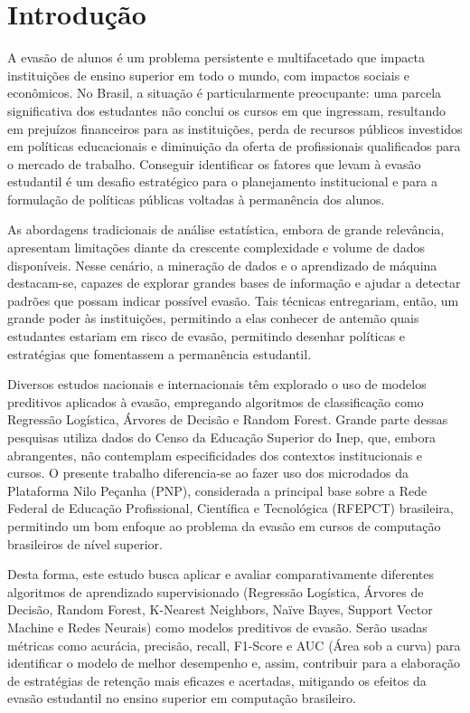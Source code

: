 \documentclass[english, spanish, brazilian]{RBIEarticle} %
\begin{document}
\pagebreak


\section{Introdução}
A evasão de alunos é um problema persistente e multifacetado que impacta instituições de ensino superior em todo o mundo, com impactos sociais e econômicos. No Brasil, a situação é particularmente preocupante: uma parcela significativa dos estudantes não conclui os cursos em que ingressam, resultando em prejuízos financeiros para as instituições, perda de recursos públicos investidos em políticas educacionais e diminuição da oferta de profissionais qualificados para o mercado de trabalho.  Conseguir identificar os fatores que levam à evasão estudantil é um desafio estratégico para o planejamento institucional e para a formulação de políticas públicas voltadas à permanência dos alunos.

As abordagens tradicionais de análise estatística, embora de grande relevância, apresentam limitações diante da crescente complexidade e volume de dados disponíveis. Nesse cenário, a mineração de dados e o aprendizado de máquina destacam-se, capazes de explorar grandes bases de informação e ajudar a detectar padrões que possam indicar possível evasão. Tais técnicas entregariam, então, um grande poder às instituições, permitindo a elas conhecer de antemão quais estudantes estariam em risco de evasão, permitindo desenhar políticas e estratégias que fomentassem a permanência estudantil.

Diversos estudos nacionais e internacionais têm explorado o uso de modelos preditivos aplicados à evasão, empregando algoritmos de classificação como Regressão Logística, Árvores de Decisão e Random Forest. Grande parte dessas pesquisas utiliza dados do Censo da Educação Superior do Inep, que, embora abrangentes, não contemplam especificidades dos contextos institucionais e cursos. O presente trabalho diferencia-se ao fazer uso dos microdados da Plataforma Nilo Peçanha (PNP), considerada a principal base sobre a Rede Federal de Educação Profissional, Científica e Tecnológica (RFEPCT) brasileira, permitindo um bom enfoque ao problema da evasão em cursos de computação brasileiros de nível superior.

Desta forma, este estudo busca aplicar e avaliar comparativamente diferentes algoritmos de aprendizado supervisionado (Regressão Logística, Árvores de Decisão, Random Forest, K-Nearest Neighbors, Naïve Bayes, Support Vector Machine e Redes Neurais) como modelos preditivos de evasão. Serão usadas métricas como acurácia, precisão, recall, F1-Score e AUC (Área sob a curva) para identificar o modelo de melhor desempenho e, assim, contribuir para a elaboração de estratégias de retenção mais eficazes e acertadas, mitigando os efeitos da evasão estudantil no ensino superior em computação brasileiro.
\end{document}
